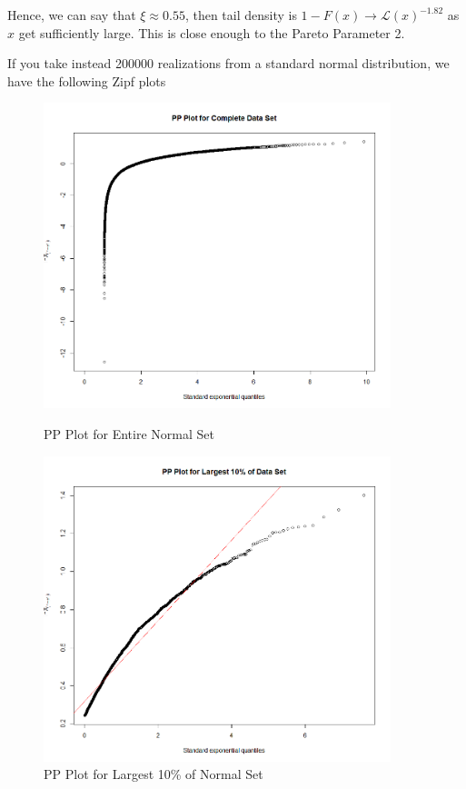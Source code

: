 \documentclass[letterpaper,12pt,titlepage,oneside,final]{book}
\begin{document}
Hence, we can say that $\xi \approx 0.55$, then tail density is  $1 - F(x) \to \mathcal{L}(x) ^{-1.82}$ as $x$ get sufficiently large. This is close enough to the Pareto Parameter 2.


If you take instead 200000 realizations from a standard normal distribution, we have the following Zipf plots
	
		\begin{figure}
		\centering
		\begin{minipage}{0.45\textwidth}
			\centering
			\includegraphics[width=0.9\textwidth]{NormWhole}
			\caption{PP Plot for Entire Normal Set}
			\label{fig: NormWhole}
		\end{minipage}\hfill
		\begin{minipage}{0.45\textwidth}
			\centering
			\includegraphics[width=0.9\textwidth]{Norm10}
			\caption{PP Plot for Largest 10\% of Normal Set}
			\label{fig: Norm10}
		\end{minipage}
	\end{figure}
\end{document}
